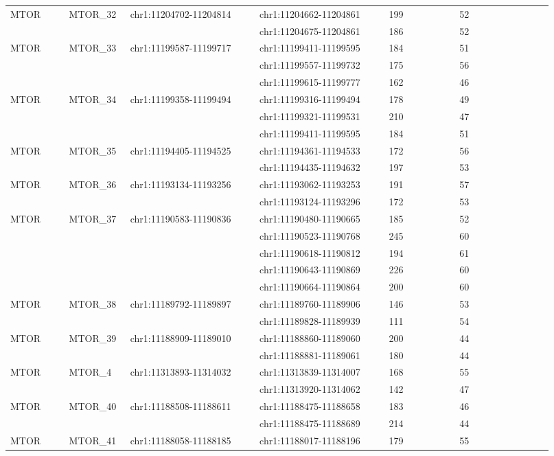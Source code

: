 \begin{landscape}
\begin{longtable}{p{0.1\linewidth}|p{0.1\linewidth}p{0.22\linewidth}p{0.22\linewidth}p{0.12\linewidth}p{0.16\linewidth}}
\\
MTOR & MTOR\_32 & chr1:11204702-11204814 & chr1:11204662-11204861 & 199 & 52
\\
 & & & chr1:11204675-11204861 & 186 & 52
\\
MTOR & MTOR\_33 & chr1:11199587-11199717 & chr1:11199411-11199595 & 184 & 51
\\
 & & & chr1:11199557-11199732 & 175 & 56
\\
 & & & chr1:11199615-11199777 & 162 & 46
\\
MTOR & MTOR\_34 & chr1:11199358-11199494 & chr1:11199316-11199494 & 178 & 49
\\
 & & & chr1:11199321-11199531 & 210 & 47
\\
 & & & chr1:11199411-11199595 & 184 & 51
\\
MTOR & MTOR\_35 & chr1:11194405-11194525 & chr1:11194361-11194533 & 172 & 56
\\
 & & & chr1:11194435-11194632 & 197 & 53
\\
MTOR & MTOR\_36 & chr1:11193134-11193256 & chr1:11193062-11193253 & 191 & 57
\\
 & & & chr1:11193124-11193296 & 172 & 53
\\
MTOR & MTOR\_37 & chr1:11190583-11190836 & chr1:11190480-11190665 & 185 & 52
\\
 & & & chr1:11190523-11190768 & 245 & 60
\\
 & & & chr1:11190618-11190812 & 194 & 61
\\
 & & & chr1:11190643-11190869 & 226 & 60
\\
 & & & chr1:11190664-11190864 & 200 & 60
\\
MTOR & MTOR\_38 & chr1:11189792-11189897 & chr1:11189760-11189906 & 146 & 53
\\
 & & & chr1:11189828-11189939 & 111 & 54
\\
MTOR & MTOR\_39 & chr1:11188909-11189010 & chr1:11188860-11189060 & 200 & 44
\\
 & & & chr1:11188881-11189061 & 180 & 44
\\
MTOR & MTOR\_4 & chr1:11313893-11314032 & chr1:11313839-11314007 & 168 & 55
\\
 & & & chr1:11313920-11314062 & 142 & 47
\\
MTOR & MTOR\_40 & chr1:11188508-11188611 & chr1:11188475-11188658 & 183 & 46
\\
 & & & chr1:11188475-11188689 & 214 & 44
\\
MTOR & MTOR\_41 & chr1:11188058-11188185 & chr1:11188017-11188196 & 179 & 55
\\

\end{longtable}
\end{landscape}
